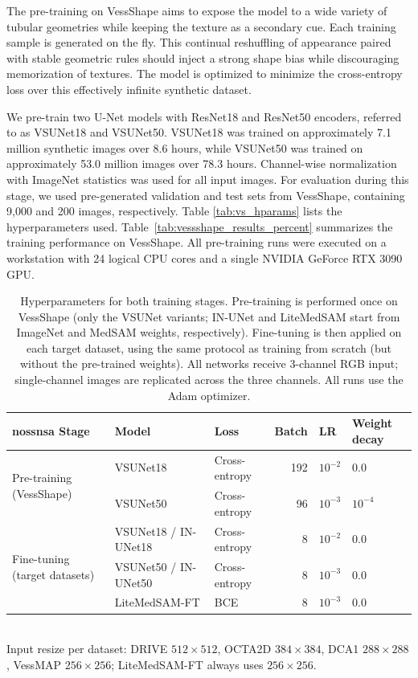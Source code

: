 \documentclass[%
reprint,
nofootinbib,
 amsmath,amssymb,
aps,
superscriptaddress,
showkeys,
longbibliography
]{revtex4-1}
\begin{document}
The pre-training on VessShape aims to expose the model to a wide variety of tubular geometries while keeping the texture as a secondary cue. Each training sample is generated on the fly. This continual reshuffling of appearance paired with stable geometric rules should inject a strong shape bias while discouraging memorization of textures. The model is optimized to minimize the cross-entropy loss over this effectively infinite synthetic dataset. 

We pre-train two U-Net models with ResNet18 and ResNet50 encoders, referred to as VSUNet18 and VSUNet50. VSUNet18 was trained on approximately 7.1 million synthetic images over 8.6 hours, while VSUNet50 was trained on approximately 53.0 million images over 78.3 hours. Channel-wise normalization with ImageNet statistics was used for all input images. For evaluation during this stage, we used pre-generated validation and test sets from VessShape, containing 9,000 and 200 images, respectively. Table \ref{tab:vs_hparams} lists the hyperparameters used. Table~\ref{tab:vessshape_results_percent} summarizes the training performance on VessShape. All pre-training runs were executed on a workstation with 24 logical CPU cores and a single NVIDIA GeForce RTX 3090 GPU.

\begin{table}[t]
    \caption{Hyperparameters for both training stages. Pre-training is performed once on VessShape (only the VSUNet variants; IN-UNet and LiteMedSAM start from ImageNet and MedSAM weights, respectively). Fine-tuning is then applied on each target dataset, using the same protocol as training from scratch (but without the pre-trained weights). All networks receive 3-channel RGB input; single-channel images are replicated across the three channels. All runs use the Adam optimizer.}
    \label{tab:vs_hparams}
    \label{tab:finetune_hparams}
    \centering
    \begingroup
    \small
    \setlength{\tabcolsep}{6pt}
    \renewcommand{\arraystretch}{1.2}
    \begin{tabular}{l l l r l l}nossnsa
        \hline
        \textbf{Stage} & \textbf{Model} & \textbf{Loss} & \textbf{Batch} & \textbf{LR} & \textbf{Weight decay} \\
        \hline
        \multirow{2}{*}{Pre-training (VessShape)} & VSUNet18 & Cross-entropy & 192 & $10^{-2}$ & 0.0 \\
         & VSUNet50 & Cross-entropy & 96 & $10^{-3}$ & $10^{-4}$ \\
        \hline
        \multirow{3}{*}{Fine-tuning (target datasets)} & VSUNet18 / IN-UNet18 & Cross-entropy & 8 & $10^{-2}$ & 0.0 \\
         & VSUNet50 / IN-UNet50 & Cross-entropy & 8 & $10^{-3}$ & 0.0 \\
         & LiteMedSAM-FT & BCE & 8 & $10^{-3}$ & 0.0 \\
        \hline
    \end{tabular}
    \endgroup
    \\[3pt]
    {\footnotesize Input resize per dataset: DRIVE $512{\times}512$, OCTA2D $384{\times}384$, DCA1 $288{\times}288$, VessMAP $256{\times}256$; LiteMedSAM-FT always uses $256{\times}256$.}
\end{table}
\end{document}
